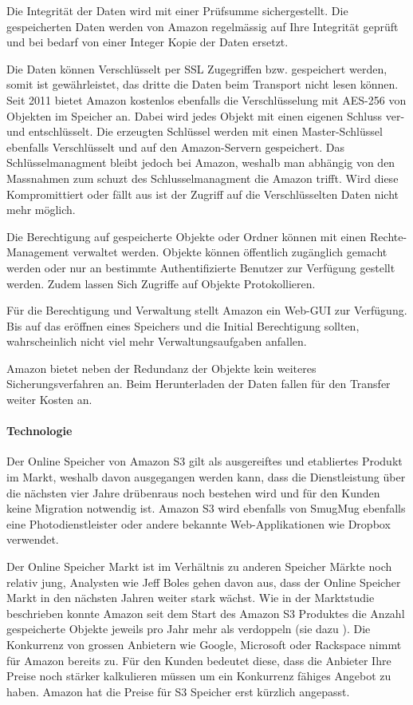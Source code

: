 Die Integrität der Daten wird mit einer Prüfsumme sichergestellt. Die gespeicherten Daten werden von Amazon regelmässig auf Ihre Integrität geprüft und bei bedarf von einer Integer Kopie der Daten ersetzt. 

Die Daten können Verschlüsselt per SSL Zugegriffen bzw. gespeichert werden, somit ist gewährleistet, das dritte die Daten beim Transport nicht lesen können. Seit 2011 bietet Amazon kostenlos ebenfalls die Verschlüsselung mit AES-256 von Objekten im Speicher an. Dabei wird jedes Objekt mit einen eigenen Schluss ver- und entschlüsselt. Die erzeugten Schlüssel werden mit einen Master-Schlüssel ebenfalls Verschlüsselt und auf den Amazon-Servern gespeichert. Das Schlüsselmanagment bleibt jedoch bei Amazon, weshalb man abhängig von den Massnahmen zum schuzt des Schlusselmanagment die Amazon trifft. Wird diese Kompromittiert oder fällt aus ist der Zugriff auf die Verschlüsselten Daten nicht mehr möglich.\cite{RobertLippert2011}

Die Berechtigung auf gespeicherte Objekte oder Ordner können mit einen Rechte-Management verwaltet werden. Objekte können öffentlich zugänglich gemacht werden oder nur an bestimmte Authentifizierte Benutzer zur Verfügung gestellt werden. Zudem lassen Sich Zugriffe auf Objekte Protokollieren.\cite{Amazon2012b}

Für die Berechtigung und Verwaltung stellt Amazon ein Web-GUI zur Verfügung. Bis auf das eröffnen eines Speichers und die Initial Berechtigung sollten, wahrscheinlich nicht viel mehr Verwaltungsaufgaben anfallen.

Amazon bietet neben der Redundanz der Objekte kein weiteres Sicherungsverfahren an. Beim Herunterladen der Daten fallen für den Transfer weiter Kosten an.

\paragraph*{Technologie}
Der Online Speicher von Amazon S3 gilt als ausgereiftes und etabliertes Produkt im Markt, weshalb davon ausgegangen werden kann, dass die Dienstleistung über die nächsten vier Jahre drübenraus noch bestehen wird und für den Kunden keine Migration notwendig ist. Amazon S3 wird ebenfalls von SmugMug ebenfalls eine Photodienstleister oder andere bekannte Web-Applikationen wie Dropbox verwendet.\cite{SmugMug}\cite{Dropbox2011}

Der Online Speicher Markt ist im Verhältnis zu anderen Speicher Märkte noch relativ jung, Analysten wie Jeff Boles gehen davon aus, dass der Online Speicher Markt in den nächsten Jahren weiter stark wächst. Wie in der Marktstudie beschrieben konnte Amazon seit dem Start des Amazon S3 Produktes die Anzahl gespeicherte Objekte jeweils pro Jahr mehr als verdoppeln (sie dazu ). Die Konkurrenz von grossen Anbietern wie Google, Microsoft oder Rackspace nimmt für Amazon bereits zu. Für den Kunden bedeutet diese, dass die Anbieter Ihre Preise noch stärker kalkulieren müssen um ein Konkurrenz fähiges Angebot zu haben. Amazon hat die Preise für S3 Speicher erst kürzlich angepasst.\cite{Boles2011}\cite{Barr2012a}


